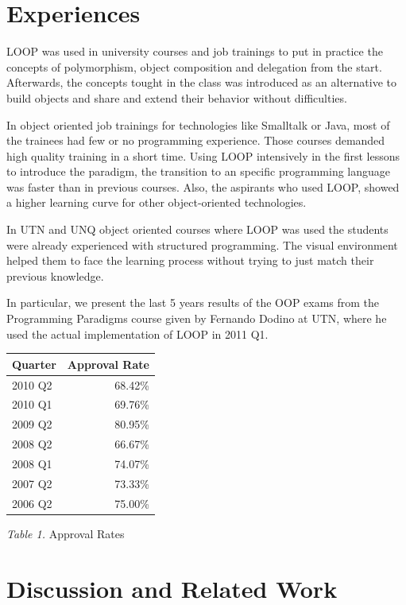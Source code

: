\documentclass{sigplanconf}
\begin{document}
\section{Experiences}

LOOP was used in university courses and job trainings to put in practice the concepts of polymorphism, object composition and delegation from the start.  Afterwards, the concepts tought in the class was introduced as an alternative to build objects and share and extend their behavior without difficulties.

\bigskip
In object oriented job trainings for technologies like Smalltalk or Java, most of the trainees had few or no programming experience. Those courses demanded high quality training in a short time. Using LOOP intensively in the first lessons to introduce the paradigm, the transition to an specific programming language was faster than in previous courses. Also, the aspirants who used LOOP, showed a higher learning curve for other object-oriented technologies.

In UTN and UNQ object oriented courses where LOOP was used the students were already experienced with structured programming.  The visual environment helped them to face the learning process without trying to just match their previous knowledge.

In particular, we present the last 5 years results of the OOP exams from the Programming Paradigms course given by Fernando Dodino at UTN, where he used the actual implementation of LOOP in 2011 Q1.

\begin{center}
\begin{tabular}{|l|r|}
\hline
Quarter & Approval Rate \\
\hline
2010 Q2 & 68.42\% \\
2010 Q1 & 69.76\% \\
2009 Q2 & 80.95\% \\
2008 Q2 & 66.67\% \\
2008 Q1 & 74.07\% \\
2007 Q2 & 73.33\% \\
2006 Q2 & 75.00\% \\
\hline
\end{tabular}

\emph{Table 1.} Approval Rates
\end{center}

\section{Discussion and Related Work}
\end{document}
